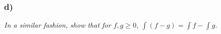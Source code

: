 \documentclass[12pt]{article}
\theoremstyle{plain}
\begin{document}


\subsubsection*{ d)}
\emph{In a similar fashion, show that for $f, g \geq 0$, $\int(f - g) = \int f - \int g$.} \\
\end{document}

